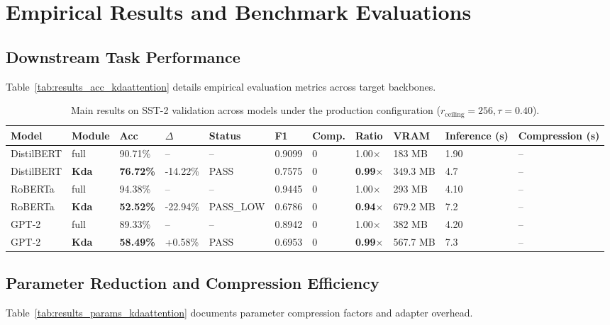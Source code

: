 \section{Empirical Results and Benchmark Evaluations}

\subsection{Downstream Task Performance}
Table~\ref{tab:results_acc_kdaattention} details empirical evaluation metrics across target backbones.

\begin{table}[t]
\centering
\small
\begin{tabular}{lllllllllll}
\toprule
\textbf{Model} & \textbf{Module} & \textbf{Acc} & \textbf{$\Delta$} & \textbf{Status} & \textbf{F1} & \textbf{Comp.} & \textbf{Ratio} & \textbf{VRAM} & \textbf{Inference (s)} & \textbf{Compression (s)} \\
\midrule
DistilBERT & full & 90.71\% & -- & -- & 0.9099 & 0 & 1.00$\times$ & 183 MB & 1.90 & -- \\
DistilBERT & \textbf{Kda} & \textbf{76.72\%} & -14.22\% & PASS & 0.7575 & 0 & \textbf{0.99$\times$} & 349.3 MB & 4.7 & -- \\
RoBERTa & full & 94.38\% & -- & -- & 0.9445 & 0 & 1.00$\times$ & 293 MB & 4.10 & -- \\
RoBERTa & \textbf{Kda} & \textbf{52.52\%} & -22.94\% & PASS\_LOW & 0.6786 & 0 & \textbf{0.94$\times$} & 679.2 MB & 7.2 & -- \\
GPT-2 & full & 89.33\% & -- & -- & 0.8942 & 0 & 1.00$\times$ & 382 MB & 4.20 & -- \\
GPT-2 & \textbf{Kda} & \textbf{58.49\%} & +0.58\% & PASS & 0.6953 & 0 & \textbf{0.99$\times$} & 567.7 MB & 7.3 & -- \\
\bottomrule
\end{tabular}
\caption{Main results on SST-2 validation across models under the production configuration ($r_{\mathrm{ceiling}}=256, \tau=0.40$).}
\label{tab:main_sst2}
\end{table}

\subsection{Parameter Reduction and Compression Efficiency}
Table~\ref{tab:results_params_kdaattention} documents parameter compression factors and adapter overhead.

